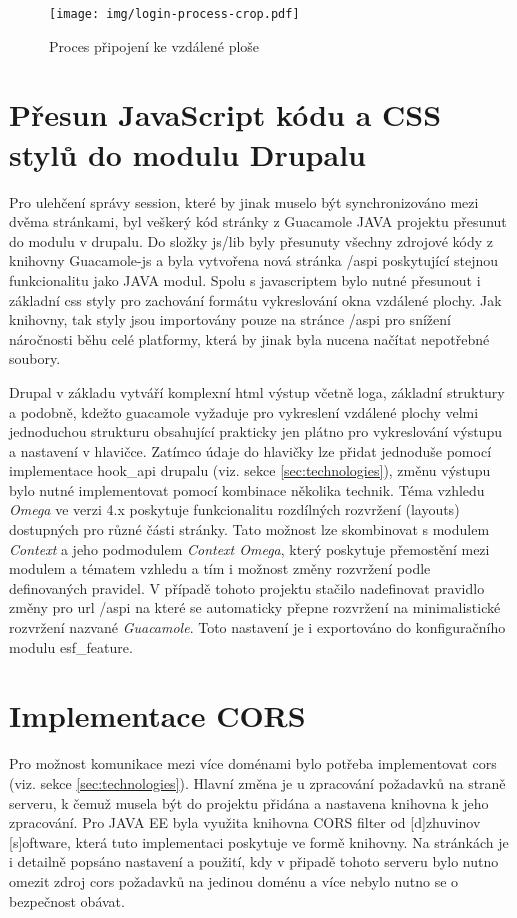 \begin{figure}[]
  \texttt{[image: img/login-process-crop.pdf]}
  \caption{Proces připojení ke vzdálené ploše}
  \label{fig:login_process}
\end{figure}  

\section{Přesun JavaScript kódu a CSS stylů do modulu Drupalu}
Pro ulehčení správy \gls{session}, které by jinak muselo být synchronizováno mezi dvěma stránkami, byl veškerý kód stránky z Guacamole JAVA projektu přesunut do modulu v drupalu. Do složky js/lib byly přesunuty všechny zdrojové kódy z knihovny Guacamole-js a byla vytvořena nová stránka /aspi poskytující stejnou funkcionalitu jako JAVA modul. Spolu s javascriptem bylo nutné přesunout i základní css styly pro zachování formátu vykreslování okna vzdálené plochy. Jak knihovny, tak styly jsou importovány pouze na stránce /aspi pro snížení náročnosti běhu celé platformy, která by jinak byla nucena načítat nepotřebné soubory. 

Drupal v základu vytváří komplexní html výstup včetně loga, základní struktury a podobně, kdežto guacamole vyžaduje pro vykreslení vzdálené plochy velmi jednoduchou strukturu obsahující prakticky jen plátno pro vykreslování výstupu a nastavení v hlavičce. Zatímco údaje do hlavičky lze přidat jednoduše pomocí implementace hook\_api drupalu (viz. sekce \ref{sec:technologies}), změnu výstupu bylo nutné implementovat pomocí kombinace několika technik. Téma vzhledu \emph{Omega} ve verzi 4.x poskytuje funkcionalitu rozdílných rozvržení (layouts) dostupných pro různé části stránky. Tato možnost lze skombinovat s modulem \emph{Context} a jeho podmodulem \emph{Context Omega}, který poskytuje přemostění mezi modulem a tématem vzhledu a tím i možnost změny rozvržení podle definovaných pravidel. V případě tohoto projektu stačilo nadefinovat pravidlo změny pro url /aspi na které se automaticky přepne rozvržení na minimalistické rozvržení nazvané \emph{Guacamole}. Toto nastavení je i exportováno do konfiguračního modulu esf\_feature.

\section{Implementace CORS}
Pro možnost komunikace mezi více doménami bylo potřeba implementovat \gls{cors} (viz. sekce \ref{sec:technologies}). Hlavní změna je u zpracování požadavků na straně serveru, k čemuž musela být do projektu přidána a nastavena knihovna k jeho zpracování. Pro JAVA EE byla využita knihovna CORS filter od [d]zhuvinov  [s]oftware\cite{website:cors-filter}, která tuto implementaci poskytuje ve formě knihovny. Na stránkách je i detailně popsáno nastavení a použití, kdy v připadě tohoto serveru bylo nutno omezit zdroj \gls{cors} požadavků na jedinou doménu a více nebylo nutno se o bezpečnost obávat.

